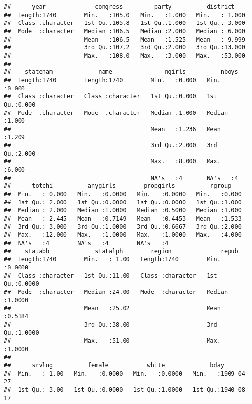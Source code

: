 \documentclass[
]{article}
\begin{document}
\begin{verbatim}
##      year              congress         party          district     
##  Length:1740        Min.   :105.0   Min.   :1.000   Min.   : 1.000  
##  Class :character   1st Qu.:105.8   1st Qu.:1.000   1st Qu.: 3.000  
##  Mode  :character   Median :106.5   Median :2.000   Median : 6.000  
##                     Mean   :106.5   Mean   :1.525   Mean   : 9.999  
##                     3rd Qu.:107.2   3rd Qu.:2.000   3rd Qu.:13.000  
##                     Max.   :108.0   Max.   :3.000   Max.   :53.000  
##                                                                     
##    statenam             name               ngirls          nboys      
##  Length:1740        Length:1740        Min.   :0.000   Min.   :0.000  
##  Class :character   Class :character   1st Qu.:0.000   1st Qu.:0.000  
##  Mode  :character   Mode  :character   Median :1.000   Median :1.000  
##                                        Mean   :1.236   Mean   :1.209  
##                                        3rd Qu.:2.000   3rd Qu.:2.000  
##                                        Max.   :8.000   Max.   :6.000  
##                                        NA's   :4       NA's   :4      
##      totchi          anygirls        propgirls          rgroup     
##  Min.   : 0.000   Min.   :0.0000   Min.   :0.0000   Min.   :0.000  
##  1st Qu.: 2.000   1st Qu.:0.0000   1st Qu.:0.0000   1st Qu.:1.000  
##  Median : 2.000   Median :1.0000   Median :0.5000   Median :1.000  
##  Mean   : 2.445   Mean   :0.7149   Mean   :0.4453   Mean   :1.533  
##  3rd Qu.: 3.000   3rd Qu.:1.0000   3rd Qu.:0.6667   3rd Qu.:2.000  
##  Max.   :12.000   Max.   :1.0000   Max.   :1.0000   Max.   :4.000  
##  NA's   :4        NA's   :4        NA's   :4                       
##    statabb             statalph        region              repub       
##  Length:1740        Min.   : 1.00   Length:1740        Min.   :0.0000  
##  Class :character   1st Qu.:11.00   Class :character   1st Qu.:0.0000  
##  Mode  :character   Median :24.00   Mode  :character   Median :1.0000  
##                     Mean   :25.02                      Mean   :0.5184  
##                     3rd Qu.:38.00                      3rd Qu.:1.0000  
##                     Max.   :51.00                      Max.   :1.0000  
##                                                                        
##      srvlng          female           white             bday           
##  Min.   : 1.00   Min.   :0.0000   Min.   :0.0000   Min.   :1909-04-27  
##  1st Qu.: 3.00   1st Qu.:0.0000   1st Qu.:1.0000   1st Qu.:1940-08-17  

\end{verbatim}
\end{document}

